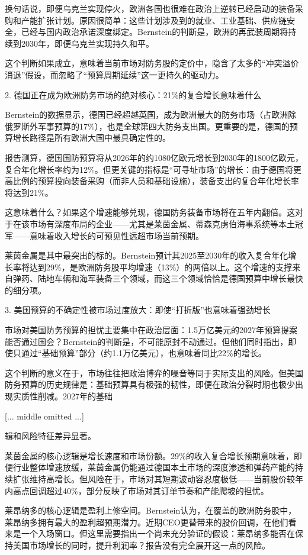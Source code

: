 \documentclass[11pt]{ctexart}
\begin{document}
换句话说，即便乌克兰实现停火，欧洲各国也很难在政治上逆转已经启动的装备采购和产能扩张计划。原因很简单：这些计划涉及到的就业、工业基础、供应链安全，已经与国内政治承诺深度绑定。Bernstein的判断是，欧洲的再武装周期将持续到2030年，即便乌克兰实现持久和平。

这个判断如果成立，意味着当前市场对防务股的定价中，隐含了太多的“冲突溢价消退”假设，而忽略了“预算周期延续”这一更持久的驱动力。

2. 德国正在成为欧洲防务市场的绝对核心：21\%的复合增长意味着什么

Bernstein的数据显示，德国已经超越英国，成为欧洲最大的防务市场（占欧洲除俄罗斯外军事预算的17\%），也是全球第四大防务支出国。更重要的是，德国的预算增长路径是所有欧洲大国中最具确定性的。

报告测算，德国国防预算将从2026年的约1080亿欧元增长到2030年的1800亿欧元，复合年化增长率约为12\%。但更关键的指标是“可寻址市场”的增长：由于德国将更高比例的预算投向装备采购（而非人员和基础设施），装备支出的复合年化增长率将达到21\%。

这意味着什么？如果这个增速能够兑现，德国防务装备市场将在五年内翻倍。这对于在该市场有深度布局的企业——尤其是莱茵金属、蒂森克虏伯海事系统等本土冠军——意味着收入增长的可预见性远超市场当前预期。

莱茵金属是其中最突出的标的。Bernstein预计其2025至2030年的收入复合年化增长率将达到29\%，是欧洲防务股平均增速（13\%）的两倍以上。这个增速的支撑来自弹药、陆地车辆和海军装备三个领域，而这三个领域恰恰是德国预算中增长最快的细分项。

3. 美国预算的不确定性被市场过度放大：即使“打折版”也意味着强劲增长

市场对美国防务预算的担忧主要集中在政治层面：1.5万亿美元的2027年预算提案能否通过国会？Bernstein的判断是，不可能原封不动通过。但他们同时指出，即使只通过“基础预算”部分（约1.1万亿美元），也意味着同比22\%的增长。

这个判断的意义在于，市场往往把政治博弈的噪音等同于实际支出的风险。但美国防务预算的历史规律是：基础预算具有极强的韧性，即便在政治分裂时期也极少出现实质性削减。2027年的基础

[... middle omitted ...]

辑和风险特征差异显著。

莱茵金属的核心逻辑是增长速度和市场份额。29\%的收入复合增长预期意味着，即便行业整体增速放缓，莱茵金属仍能通过德国本土市场的深度渗透和弹药产能的持续扩张维持高增长。但风险在于，市场对其短期波动容忍度极低——当前股价较年内高点回调超过40\%，部分反映了市场对其订单节奏和产能爬坡的担忧。

莱昂纳多的核心逻辑是盈利上修空间。Bernstein认为，在覆盖的欧洲防务股中，莱昂纳多拥有最大的盈利超预期潜力。近期CEO更替带来的股价回调，在他们看来是一个入场窗口。但这里需要指出一个尚未充分验证的假设：莱昂纳多能否在保持美国市场增长的同时，提升利润率？报告没有完全展开这一点的风险。
\end{document}
